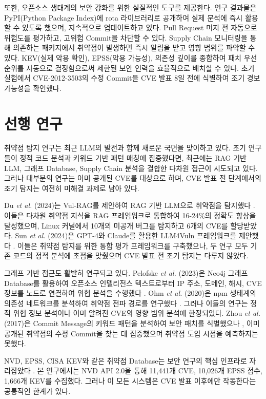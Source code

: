 ﻿\documentclass[conference]{IEEEtran}
\begin{document}
또한, 오픈소스 생태계의 보안 강화를 위한 실질적인 도구를 제공한다. 연구 결과물은 PyPI(Python Package Index)에 rota 라이브러리로 공개하여 실제 분석에 즉시 활용할 수 있도록 했으며, 지속적으로 업데이트하고 있다. Pull Request 머지 전 자동으로 위험도를 평가하고, 고위험 Commit을 차단할 수 있다. Supply Chain 모니터링을 통해 의존하는 패키지에서 취약점이 발생하면 즉시 알림을 받고 영향 범위를 파악할 수 있다. KEV(실제 악용 확인), EPSS(악용 가능성), 의존성 깊이를 종합하여 패치 우선순위를 자동으로 결정함으로써 제한된 보안 인력을 효율적으로 배치할 수 있다. 초기 실험에서 CVE-2012-3503의 수정 Commit을 CVE 발표 8일 전에 식별하여 조기 경보 가능성을 확인했다.


\section{선행 연구}

취약점 탐지 연구는 최근 LLM의 발전과 함께 새로운 국면을 맞이하고 있다. 초기 연구들이 정적 코드 분석과 키워드 기반 패턴 매칭에 집중했다면, 최근에는 RAG 기반 LLM, 그래프 Database, Supply Chain 분석을 결합한 다차원 접근이 시도되고 있다. 그러나 대부분의 연구는 이미 공개된 CVE를 대상으로 하며, CVE 발표 전 단계에서의 조기 탐지는 여전히 미해결 과제로 남아 있다.

Du \textit{et al.} (2024)는 Vul-RAG를 제안하여 RAG 기반 LLM으로 취약점을 탐지했다 \cite{vulrag2024}. 이들은 다차원 취약점 지식을 RAG 프레임워크로 통합하여 16-24\%의 정확도 향상을 달성했으며, Linux 커널에서 10개의 미공개 버그를 탐지하고 6개의 CVE를 할당받았다. Sun \textit{et al.} (2024)은 GPT-4와 Claude를 활용한 LLM4Vuln 프레임워크를 제안했다 \cite{sun2024}. 이들은 취약점 탐지를 위한 통합 평가 프레임워크를 구축했으나, 두 연구 모두 기존 코드의 정적 분석에 초점을 맞췄으며 CVE 발표 전 조기 탐지는 다루지 않았다.

그래프 기반 접근도 활발히 연구되고 있다. Pelofske \textit{et al.} (2023)은 Neo4j 그래프 Database를 활용하여 오픈소스 인텔리전스 텍스트로부터 IP 주소, 도메인, 해시, CVE 정보를 노드로 연결하여 위협 분석을 수행했다 \cite{pelofske2023}. Ohm \textit{et al.} (2020)은 npm 생태계의 의존성 네트워크를 분석하여 취약점 전파 경로를 연구했다 \cite{ohm2020}. 그러나 이들의 연구는 정적 위협 정보 분석이나 이미 알려진 CVE의 영향 범위 분석에 한정되었다. Zhou \textit{et al.} (2017)은 Commit Message의 키워드 패턴을 분석하여 보안 패치를 식별했으나 \cite{zhou2017}, 이미 공개된 취약점의 수정 Commit을 찾는 데 집중했으며 취약점 도입 시점을 예측하지는 못했다.

NVD, EPSS, CISA KEV와 같은 취약점 Database는 보안 연구의 핵심 인프라로 자리잡았다 \cite{nvd2025, epss2025, cisa2025}. 본 연구에서는 NVD API 2.0을 통해 11,441개 CVE, 10,026개 EPSS 점수, 1,666개 KEV를 수집했다. 그러나 이 모든 시스템은 CVE 발표 이후에만 작동한다는 공통적인 한계가 있다.
\end{document}
